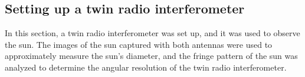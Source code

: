 \documentclass[12pt]{article}
\begin{document}
\subsection{Setting up a twin radio interferometer}
In this section, a twin radio interferometer was set up, and it was used to observe the sun. The images of the sun captured with both antennas were used to approximately measure the sun's diameter, and the fringe pattern of the sun was analyzed to determine the angular resolution of the twin radio interferometer. 

\newpage

\printbibliography
\end{document}
